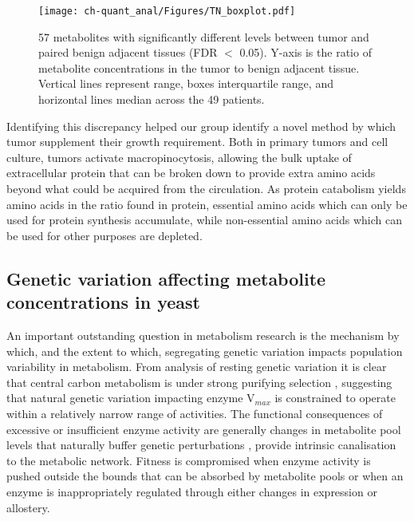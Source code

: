 \begin{figure}[h!]
\begin{center}
\texttt{[image: ch-quant\_anal/Figures/TN\_boxplot.pdf]}
\caption[Metabolites accumulated or depleted in pancreatic cancer]{57 metabolites with significantly different levels between tumor and paired benign adjacent tissues (FDR $<$ 0.05). Y-axis is the ratio of metabolite concentrations in the tumor to benign adjacent tissue. Vertical lines represent range, boxes interquartile range, and horizontal lines median across the 49 patients.}
\label{ch-quant_anal:tnboxplot}
\end{center}
\end{figure}

Identifying this discrepancy helped our group identify a novel method by which tumor supplement their growth requirement.  Both in primary tumors and cell culture, tumors activate macropinocytosis, allowing the bulk uptake of extracellular protein that can be broken down to provide extra amino acids beyond what could be acquired from the circulation. As protein catabolism yields amino acids in the ratio found in protein, essential amino acids which can only be used for protein synthesis accumulate, while non-essential amino acids which can be used for other purposes are depleted.  


\subsection{Genetic variation affecting metabolite concentrations in yeast}

An important outstanding question in metabolism research is the mechanism by which, and the extent to which, segregating genetic variation impacts population variability in metabolism.  From analysis of resting genetic variation it is clear that central carbon metabolism is under strong purifying selection \cite{Greenberg:2008uy}, suggesting that natural genetic variation impacting enzyme V$_{max}$ is constrained to operate within a relatively narrow range of activities. The functional consequences of excessive or insufficient enzyme activity are generally changes in metabolite pool levels that naturally buffer genetic perturbations \cite{Fendt:2010gr}, provide intrinsic canalisation to the metabolic network. Fitness is compromised when enzyme activity is pushed outside the bounds that can be absorbed by metabolite pools or when an enzyme is inappropriately regulated through either changes in expression or allostery. 

